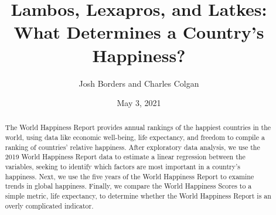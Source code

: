 \documentclass{article}
\title{Lambos, Lexapros, and Latkes: What Determines a Country's Happiness?}
\author{Josh Borders and Charles Colgan}
\date{May 3, 2021}
\begin{document}
\maketitle

\begin{abstract}
The World Happiness Report provides annual rankings of the happiest countries in the world, using data like economic well-being, life expectancy, and freedom to compile a ranking of countries' relative happiness. After exploratory data analysis, we use the 2019 World Happiness Report data to estimate a linear regression between the variables, seeking to identify which factors are most important in a country's happiness. Next, we use the five years of the World Happiness Report to examine trends in global happiness. Finally, we compare the World Happiness Scores to a simple metric, life expectancy, to determine whether the World Happiness Report is an overly complicated indicator.
\end{abstract}
\end{document}
